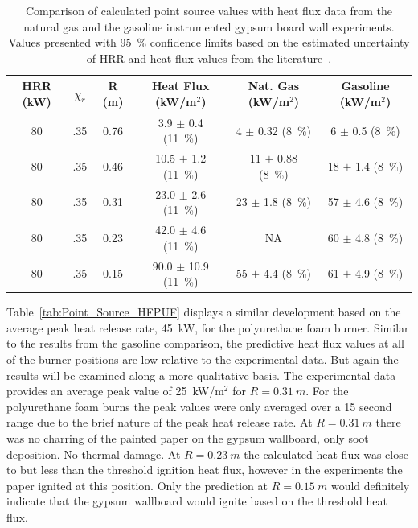 \documentclass[twoside]{uocthesis}
\begin{document}
{\begin{table}
	\centering
	\footnotesize
	\begin{tabular}{|c|c|c|c|c|c|}
	\hline
		HRR (kW) &   $\chi_r$   & R (m)	 & Heat Flux (kW/m$^2$)     &  Nat. Gas (kW/m$^2$)      & Gasoline (kW/m$^2$) 	\\ \hline 
		80    &   .35 		& 0.76 	     & 3.9 $\pm$ 0.4 (11~\%) 	&  4 $\pm$ 0.32 (8~\%) 	 	   & 6 $\pm$ 0.5 (8~\%)     \\
		80    &   .35    	& 0.46	     & 10.5 $\pm$ 1.2 (11~\%) 	&  11 $\pm$ 0.88 (8~\%)  	   & 18 $\pm$ 1.4 (8~\%)    \\
		80    &   .35 		& 0.31	     & 23.0 $\pm$ 2.6 (11~\%) 	&  23 $\pm$ 1.8 (8~\%)  	   & 57 $\pm$ 4.6 (8~\%)     \\
        80    &   .35 		& 0.23	     & 42.0 $\pm$ 4.6 (11~\%) 	&  NA 					  	   & 60 $\pm$ 4.8 (8~\%)     \\
        80    &   .35 		& 0.15	     & 90.0 $\pm$ 10.9 (11~\%) 	&  55 $\pm$ 4.4 (8~\%)  	   & 61 $\pm$ 4.9 (8~\%)     \\
	\hline
	\end{tabular}
	\caption[Comparison of calculated point source values (HRR = 80~kW) with heat flux data from the instrumented gypsum board wall experiments]{Comparison of calculated point source values with heat flux data from the natural gas and the gasoline instrumented gypsum board wall experiments. Values presented with 95~\% confidence limits based on the estimated uncertainty of HRR and heat flux values from the literature~\cite{Bryant:2003,Pitts:2006}.}
	\label{tab:Point_Source_HFNGG}
\end{table} 

Table~\ref{tab:Point_Source_HFPUF} displays a similar development based on the average peak heat release rate, 45~kW, for the polyurethane foam burner.
Similar to the results from the gasoline comparison, the predictive heat flux values at all of the burner positions are low relative to the experimental data.  But again the results will be examined along a more qualitative basis. The experimental data provides an average peak value of 25~kW/m$^2$ for $R=0.31~m$. For the polyurethane foam burns the peak values were only averaged over a 15 second range due to the brief nature of the peak heat release rate. At $R=0.31~m$ there was no charring of the painted paper on the gypsum wallboard, only soot deposition.  No thermal damage.  At $R=0.23~m$ the calculated heat flux was close to but less than the threshold ignition heat flux, however in the experiments the paper ignited at this position.  Only the prediction at $R=0.15~m$ would definitely indicate that the gypsum wallboard would ignite based on the threshold heat flux.           

}
\end{document}
